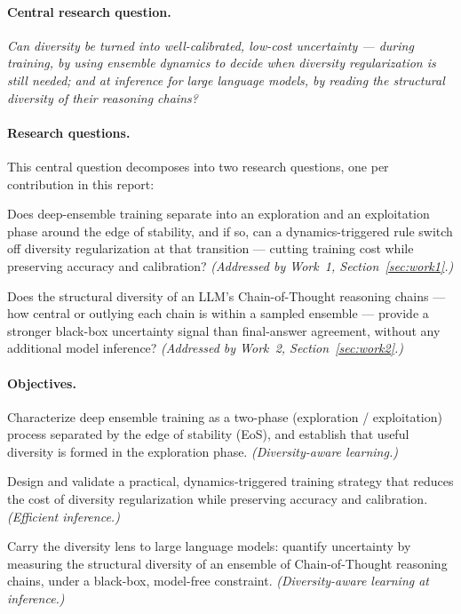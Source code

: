 \documentclass[11pt]{article}
\begin{document}
\paragraph{Central research question.}
\emph{Can diversity be turned into well-calibrated, low-cost uncertainty --- during training, by
using ensemble dynamics to decide when diversity regularization is still needed; and at inference
for large language models, by reading the structural diversity of their reasoning chains?}

\paragraph{Research questions.}
This central question decomposes into two research questions, one per contribution in this report:
\begin{description}[leftmargin=2.4em, style=nextline, itemsep=2pt]
  \item[RQ1.] Does deep-ensemble training separate into an exploration and an exploitation phase
  around the edge of stability, and if so, can a dynamics-triggered rule switch off diversity
  regularization at that transition --- cutting training cost while preserving accuracy and
  calibration? \emph{(Addressed by Work~1, Section~\ref{sec:work1}.)}
  \item[RQ2.] Does the structural diversity of an LLM's Chain-of-Thought reasoning chains --- how
  central or outlying each chain is within a sampled ensemble --- provide a stronger black-box
  uncertainty signal than final-answer agreement, without any additional model inference?
  \emph{(Addressed by Work~2, Section~\ref{sec:work2}.)}
\end{description}

\paragraph{Objectives.}
\begin{description}[leftmargin=2.4em, style=nextline, itemsep=2pt]
  \item[O1.] Characterize deep ensemble training as a two-phase (exploration / exploitation)
  process separated by the edge of stability (EoS), and establish that useful diversity is
  formed in the exploration phase. \emph{(Diversity-aware learning.)}
  \item[O2.] Design and validate a practical, dynamics-triggered training strategy that reduces
  the cost of diversity regularization while preserving accuracy and calibration.
  \emph{(Efficient inference.)}
  \item[O3.] Carry the diversity lens to large language models: quantify uncertainty by measuring
  the structural diversity of an ensemble of Chain-of-Thought reasoning chains, under a black-box,
  model-free constraint. \emph{(Diversity-aware learning at inference.)}
\end{description}
\end{document}
